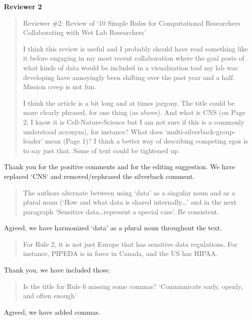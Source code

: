 \documentclass[a4paper]{article}
\begin{document}
 \textbf{Reviewer 2}

\begin{quote}
    Reviewer \#2: Review of `10 Simple Rules for Computational Researchers Collaborating with Wet Lab Researchers'

I think this review is useful and I probably should have read something like it before engaging in my most recent collaboration where the goal posts of what kinds of data would be included in a visualization tool my lab was developing have annoyingly been shifting over the past year and a half. Mission creep is not fun.

I think the article is a bit long and at times jargony. The title could be more clearly phrased, for one thing (as above). And what is CNS (on Page 2; I know it is Cell-Nature-Science but I am not sure if this is a commonly understood acronym), for instance? What does `multi-silverback-group-leader' mean (Page 1)? I think a better way of describing competing egos is to say just that. Some of text could be tightened up.


\end{quote}

Thank you for the positive comments and for the editing suggestion. We have replaced `CNS` and removed/rephrased the silverback comment.

\begin{quote}
    The authors alternate between using `data' as a singular noun and as a plural noun (`How and what data is shared internally…' and in the next paragraph `Sensitive data…represent a special case'. Be consistent.

\end{quote}

Agreed, we have harmonized `data' as a plural noun throughout the text.


\begin{quote}
    For Rule 2, it is not just Europe that has sensitive data regulations. For instance, PIPEDA is in force in Canada, and the US has HIPAA.

\end{quote}

Thank you, we have included those.

\begin{quote}
    Is the title for Rule 6 missing some commas? `Communicate early, openly, and often enough'

\end{quote}

Agreed, we have added commas.
\end{document}
